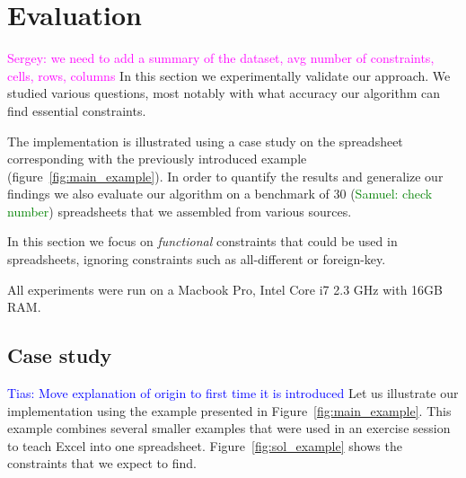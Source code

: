 \documentclass{sig-alternate-05-2015}
\newcommand{\sergey}[1]{\textcolor{magenta}{{\sc Sergey:} #1}\xspace}
\newcommand{\samuel}[1]{\textcolor{green}{{\sc Samuel:} #1}\xspace}
\newcommand{\tias}[1]{\textcolor{blue}{{\sc Tias:} #1}\xspace}
\begin{document}
\section{Evaluation}\label{sec:evaluation}
\sergey{we need to add a summary of the dataset, avg number of constraints, cells, rows, columns}
In this section we experimentally validate our approach.
We studied various questions, most notably with what accuracy our algorithm can find essential constraints.

The implementation is illustrated using a case study on the spreadsheet corresponding with the previously introduced example (figure~\ref{fig:main_example}).
In order to quantify the results and generalize our findings we also evaluate our algorithm on a benchmark of 30 (\samuel{check number}) spreadsheets that we assembled from various sources.

In this section we focus on \textit{functional} constraints that could be used in spreadsheets, ignoring constraints such as all-different or foreign-key.

All experiments were run on a Macbook Pro, Intel Core i7 2.3 GHz with 16GB RAM.

\subsection{Case study}
\tias{Move explanation of origin to first time it is introduced}
Let us illustrate our implementation using the example presented in Figure~\ref{fig:main_example}.
This example combines several smaller examples that were used in an exercise session to teach Excel into one spreadsheet.
Figure~\ref{fig:sol_example} shows the constraints that we expect to find.
\end{document}
